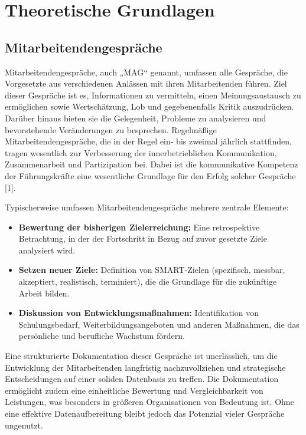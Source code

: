 \chapter{Theoretische Grundlagen}
\label{chap:theoretische-grundlagen}

\section{Mitarbeitendengespräche}
Mitarbeitendengespräche, auch „MAG“ genannt, umfassen alle Gespräche, die Vorgesetzte aus verschiedenen Anlässen mit ihren Mitarbeitenden führen. Ziel dieser Gespräche ist es, Informationen zu vermitteln, einen Meinungsaustausch zu ermöglichen sowie Wertschätzung, Lob und gegebenenfalls Kritik auszudrücken. Darüber hinaus bieten sie die Gelegenheit, Probleme zu analysieren und bevorstehende Veränderungen zu besprechen. Regelmäßige Mitarbeitendengespräche, die in der Regel ein- bis zweimal jährlich stattfinden, tragen wesentlich zur Verbesserung der innerbetrieblichen Kommunikation, Zusammenarbeit und Partizipation bei. Dabei ist die kommunikative Kompetenz der Führungskräfte eine wesentliche Grundlage für den Erfolg solcher Gespräche [1].

Typischerweise umfassen Mitarbeitendengespräche mehrere zentrale Elemente:
\begin{itemize}
    \item \textbf{Bewertung der bisherigen Zielerreichung:} Eine retrospektive Betrachtung, in der der Fortschritt in Bezug auf zuvor gesetzte Ziele analysiert wird.
    \item \textbf{Setzen neuer Ziele:} Definition von SMART-Zielen (spezifisch, messbar, akzeptiert, realistisch, terminiert), die die Grundlage für die zukünftige Arbeit bilden.
    \item \textbf{Diskussion von Entwicklungsmaßnahmen:} Identifikation von Schulungsbedarf, Weiterbildungsangeboten und anderen Maßnahmen, die das persönliche und berufliche Wachstum fördern.
\end{itemize}

Eine strukturierte Dokumentation dieser Gespräche ist unerlässlich, um die Entwicklung der Mitarbeitenden langfristig nachzuvollziehen und strategische Entscheidungen auf einer soliden Datenbasis zu treffen. Die Dokumentation ermöglicht zudem eine einheitliche Bewertung und Vergleichbarkeit von Leistungen, was besonders in größeren Organisationen von Bedeutung ist. Ohne eine effektive Datenaufbereitung bleibt jedoch das Potenzial vieler Gespräche ungenutzt.

